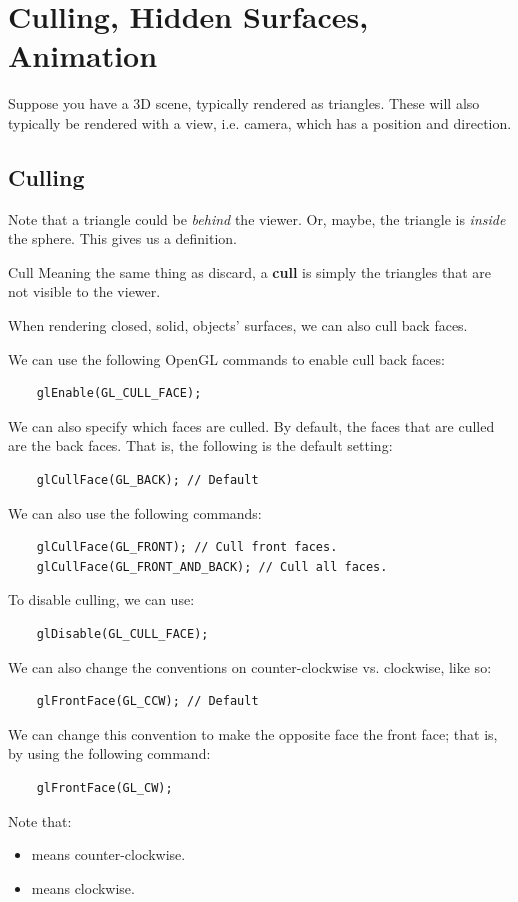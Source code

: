 \documentclass[letterpaper]{article}
\begin{document}
\section{Culling, Hidden Surfaces, Animation}
Suppose you have a 3D scene, typically rendered as triangles. These will also typically be rendered with a view, i.e. camera, which has a position and direction.

\subsection{Culling}
Note that a triangle could be \emph{behind} the viewer. Or, maybe, the triangle is \emph{inside} the sphere. This gives us a definition. 
\begin{definition}{Cull}{}
    Meaning the same thing as discard, a \textbf{cull} is simply the triangles that are not visible to the viewer. 
\end{definition}
When rendering closed, solid, objects' surfaces, we can also cull back faces. 

\bigskip 

We can use the following OpenGL commands to enable cull back faces:
\begin{verbatim}
    glEnable(GL_CULL_FACE);\end{verbatim}
We can also specify which faces are culled. By default, the faces that are culled are the back faces. That is, the following is the default setting: 
\begin{verbatim}
    glCullFace(GL_BACK); // Default\end{verbatim}
We can also use the following commands: 
\begin{verbatim}
    glCullFace(GL_FRONT); // Cull front faces. 
    glCullFace(GL_FRONT_AND_BACK); // Cull all faces. \end{verbatim}
To disable culling, we can use: 
\begin{verbatim}
    glDisable(GL_CULL_FACE);\end{verbatim}
We can also change the conventions on counter-clockwise vs. clockwise, like so: 
\begin{verbatim}
    glFrontFace(GL_CCW); // Default \end{verbatim}
We can change this convention to make the opposite face the front face; that is, by using the following command: 
\begin{verbatim}
    glFrontFace(GL_CW);\end{verbatim}
Note that:
\begin{itemize}
    \item {} means counter-clockwise.
    \item {} means clockwise.
\end{itemize}
\end{document}
